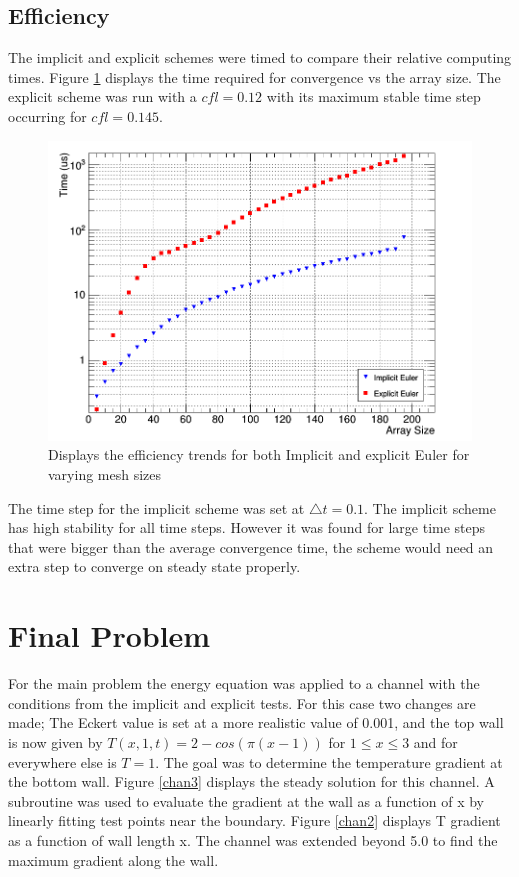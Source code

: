 \documentclass[paper=a4, fontsize=11pt, abstract=on]{scrartcl}
\numberwithin{equation}{section}		%
\numberwithin{figure}{section}			%
\numberwithin{table}{section}				%
\begin{document}
\subsection{Efficiency}
The implicit and explicit schemes were timed to compare their relative computing times. Figure \ref{eff} displays the time required for convergence vs the array size. The explicit scheme was run with a $cfl=0.12$ with its maximum stable time step occurring for $cfl=0.145$. 

\begin{figure}[H]
\centering
\includegraphics[width=0.75\linewidth]{eff}
\caption{Displays the efficiency trends for both Implicit and explicit Euler for varying mesh sizes}
\label{eff}
\end{figure}

The time step for the implicit scheme was set at $\triangle t = 0.1$. The implicit scheme has high stability for all time steps. However it was found for large time steps that were bigger than the average convergence time, the scheme would need an extra step to converge on steady state properly.

\section{Final Problem}


For the main problem the energy equation was applied to a channel with the conditions from the implicit and explicit tests. For this case two changes are made; The Eckert value is set at a more realistic value of 0.001, and the top wall is now given by $T(x,1,t) = 2-cos(\pi(x-1))$ for $1\leq x \leq 3$ and for everywhere else is $T=1$. The goal was to determine the temperature gradient at the bottom wall. Figure \ref{chan3} displays the steady solution for this channel. A subroutine was used to evaluate the gradient at the wall as a function of x by linearly fitting test points near the boundary. Figure \ref{chan2} displays T gradient as a function of wall length x. The channel was extended beyond 5.0 to  find the maximum gradient along the wall.
\end{document}
